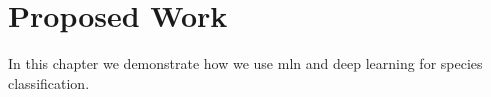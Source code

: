 \chapter{Proposed Work}

In this chapter we demonstrate how we use mln and deep learning for species classification.